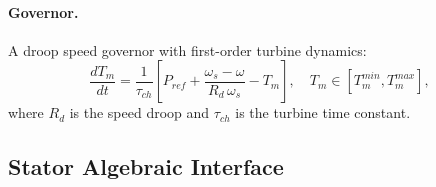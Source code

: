\documentclass[12pt,a4paper]{article}
\theoremstyle{definition}
\theoremstyle{plain}
\begin{document}
\paragraph{Governor.}
A droop speed governor with first-order turbine dynamics:
\begin{equation}
  \frac{dT_m}{dt} = \frac{1}{\tau_{ch}}\left[P_{ref}
                    + \frac{\omega_s - \omega}{R_d\,\omega_s} - T_m\right],
  \quad T_m \in [T_m^{min}, T_m^{max}],
  \label{eq:parkdq:gov}
\end{equation}
where $R_d$ is the speed droop and $\tau_{ch}$ is the turbine time constant.

\subsection{Stator Algebraic Interface}
\label{sec:parkdq:network}
\end{document}

